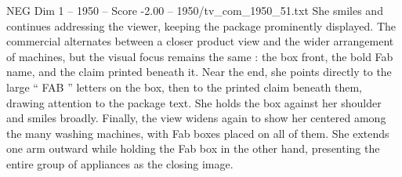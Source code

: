 \begin{textsample}{NEG Dim 1 – 1950 – Score -2.00 – 1950/tv\_com\_1950\_51.txt}
She smiles and continues addressing the viewer, keeping the package prominently displayed.
The commercial alternates between a closer product view and the wider arrangement of machines, but the visual focus remains the same : the box front, the bold Fab name, and the claim printed beneath it.
Near the end, she points directly to the large “ FAB ” letters on the box, then to the printed claim beneath them, drawing attention to the package text.
She holds the box against her shoulder and smiles broadly.
Finally, the view widens again to show her centered among the many washing machines, with Fab boxes placed on all of them.
She extends one arm outward while holding the Fab box in the other hand, presenting the entire group of appliances as the closing image.

\end{textsample}
